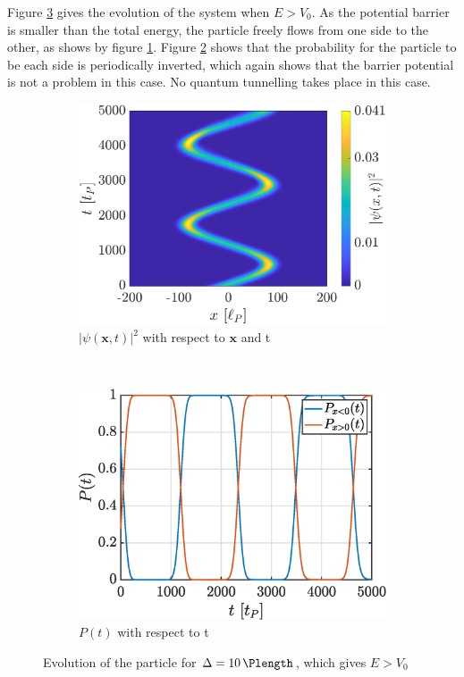 \documentclass[a4paper,12pt,twoside]{article}
\newcommand{\mbf}[1]{\mathbf{#1}} %
\begin{document}
    Figure \ref{fig:iii_evo_Egeqv0} gives the evolution of the system when $E > V_0$.
    As the potential barrier is smaller than the total energy, the particle freely flows from one side to the other, as shows by figure \ref{fig:iii_evo_Egeqv0_evo}.
    Figure \ref{fig:iii_evo_Egeqv0_prob} shows that the probability for the particle to be each side is periodically inverted, which again shows that the barrier potential is not a problem in this case.
    No quantum tunnelling takes place in this case.\\

    \begin{figure}[h]
      \centering
      \begin{subfigure}[t]{0.45\textwidth}
        \includegraphics[width=\textwidth]{graphs/iii_evo_Egeqv0_evo.eps}
        \caption{$|\psi(\mbf{x}, t)|^2$ with respect to $\mbf{x}$ and t}
        \label{fig:iii_evo_Egeqv0_evo}
      \end{subfigure}
      ~
      \begin{subfigure}[t]{0.45\textwidth}
        \includegraphics[width=\textwidth]{graphs/iii_evo_Egeqv0_prob.eps}
        \caption{$P(t)$ with respect to t}
        \label{fig:iii_evo_Egeqv0_prob}
      \end{subfigure}
      \caption{Evolution of the particle for $\Delta = \SI{10}{\Plength}$, which gives $E > V_0$}
      \label{fig:iii_evo_Egeqv0}
    \end{figure}
\end{document}
